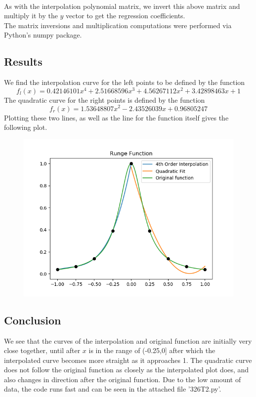 \documentclass[12pt]{article}
\begin{document}
\\As with the interpolation polynomial matrix, we invert this above matrix and multiply it by the $y$ vector to get the regression coefficients. 
\\The matrix inversions and multiplication computations were performed via Python's numpy package.
\subsection*{Results}
We find the interpolation curve for the left points to be defined by the function 
$$f_l(x) = 0.42146101x^4 + 2.51668596x^3 + 4.56267112x^2 + 3.42898463x + 1$$
The quadratic curve for the right points is defined by the function 
$$f_r(x) = 1.53648807x^2  - 2.43526039x + 0.96805247$$
Plotting these two lines, as well as the line for the function itself gives the following plot.
\begin{figure}[h]
	\includegraphics*[scale = .7]{runge.png}
\end{figure}
\subsection*{Conclusion}
We see that the curves of the interpolation and original function are initially very close together, until after $x$ is in the range of (-0.25,0] after which the interpolated curve becomes more straight as it approaches 1. The quadratic curve does not follow the original function as closely as the interpolated plot does, and also changes in direction after the original function. Due to the low amount of data, the code runs fast and can be seen in the attached file '326T2.py'.
\end{document}
